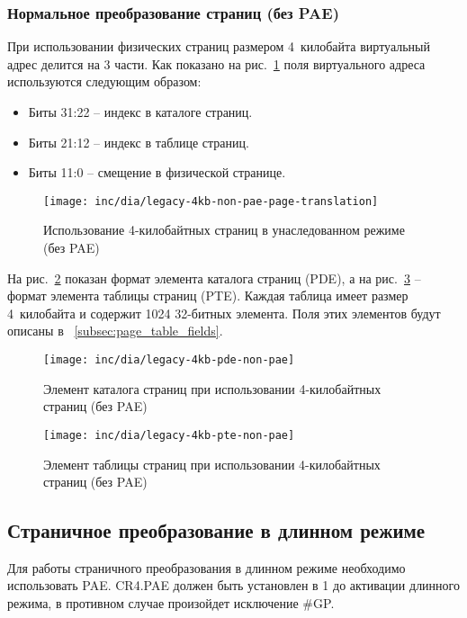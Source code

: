 \subsubsection*{Нормальное преобразование страниц (без PAE)}
При использовании физических страниц размером 4~килобайта виртуальный адрес делится на 3 части.
Как показано на рис.~\ref{fig:legacy-4kb-non-pae-page-translation} поля виртуального адреса
используются следующим образом:
\begin{itemize}
\item Биты 31:22 -- индекс в каталоге страниц.
\item Биты 21:12 -- индекс в таблице страниц.
\item Биты 11:0 -- смещение в физической странице.
\end{itemize}

\begin{figure}[ht!]
  \centering
  \texttt{[image: inc/dia/legacy-4kb-non-pae-page-translation]}
  \caption{Использование 4-килобайтных страниц в унаследованном режиме (без PAE)}
  \label{fig:legacy-4kb-non-pae-page-translation}
\end{figure}

На рис.~\ref{fig:legacy-4kb-pde-non-pae} показан формат элемента каталога страниц (PDE),
а на рис.~\ref{fig:legacy-4kb-pte-non-pae} -- формат элемента таблицы страниц (PTE).
Каждая таблица имеет размер 4~килобайта и содержит 1024 32-битных элемента. Поля этих элементов
будут описаны в ~\ref{subsec:page_table_fields}.

\begin{figure}[ht!]
  \centering
  \texttt{[image: inc/dia/legacy-4kb-pde-non-pae]}
  \caption{Элемент каталога страниц при использовании 4-килобайтных страниц (без PAE)}
  \label{fig:legacy-4kb-pde-non-pae}
\end{figure}

\begin{figure}[ht!]
  \centering
  \texttt{[image: inc/dia/legacy-4kb-pte-non-pae]}
  \caption{Элемент таблицы страниц при использовании 4-килобайтных страниц (без PAE)}
  \label{fig:legacy-4kb-pte-non-pae}
\end{figure}

\subsection{Страничное преобразование в длинном режиме}
Для работы страничного преобразования в длинном режиме необходимо использовать PAE.
CR4.PAE должен быть установлен в 1 до активации длинного режима, в противном случае
произойдет исключение \#GP.

